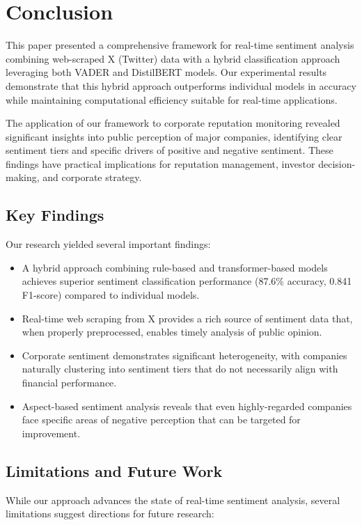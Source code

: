 \documentclass[conference]{IEEEtran}
\begin{document}
\section{Conclusion}
This paper presented a comprehensive framework for real-time sentiment analysis combining web-scraped X (Twitter) data with a hybrid classification approach leveraging both VADER and DistilBERT models. Our experimental results demonstrate that this hybrid approach outperforms individual models in accuracy while maintaining computational efficiency suitable for real-time applications.

The application of our framework to corporate reputation monitoring revealed significant insights into public perception of major companies, identifying clear sentiment tiers and specific drivers of positive and negative sentiment. These findings have practical implications for reputation management, investor decision-making, and corporate strategy.

\subsection{Key Findings}
Our research yielded several important findings:

\begin{itemize}
    \item A hybrid approach combining rule-based and transformer-based models achieves superior sentiment classification performance (87.6\% accuracy, 0.841 F1-score) compared to individual models.
    
    \item Real-time web scraping from X provides a rich source of sentiment data that, when properly preprocessed, enables timely analysis of public opinion.
    
    \item Corporate sentiment demonstrates significant heterogeneity, with companies naturally clustering into sentiment tiers that do not necessarily align with financial performance.
    
    \item Aspect-based sentiment analysis reveals that even highly-regarded companies face specific areas of negative perception that can be targeted for improvement.
\end{itemize}

\subsection{Limitations and Future Work}
While our approach advances the state of real-time sentiment analysis, several limitations suggest directions for future research:
\end{document}
